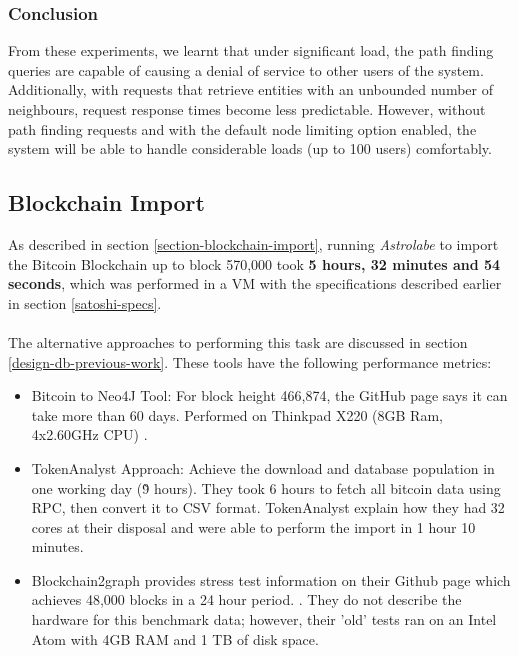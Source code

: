 \subsubsection{Conclusion}
From these experiments, we learnt that under significant load, the path finding queries are capable of causing a denial of service to other users of the system. Additionally, with requests that retrieve entities with an unbounded number of neighbours, request response times become less predictable. However, without path finding requests and with the default node limiting option enabled, the system will be able to handle considerable loads (up to 100 users) comfortably. 


\subsection{Blockchain Import}
As described in section \ref{section-blockchain-import}, running \textit{Astrolabe} to import the Bitcoin Blockchain up to block 570,000 took \textbf{5 hours, 32 minutes and 54 seconds}, which was performed in a VM with the specifications described earlier in section \ref{satoshi-specs}.
\\\\
The alternative approaches to performing this task are discussed in section \ref{design-db-previous-work}. These tools have the following performance metrics:
\begin{itemize}
    \item Bitcoin to Neo4J Tool: For block height 466,874, the GitHub page says it can take more than 60 days. Performed on Thinkpad X220 (8GB Ram, 4x2.60GHz CPU) \cite{RefWorks:doc:5c98e031e4b068320632cef2}. 
    \item TokenAnalyst Approach: Achieve the download and database population in one working day (\~9 hours). They took 6 hours to fetch all bitcoin data using RPC, then convert it to CSV format. TokenAnalyst explain how they had 32 cores at their disposal and were able to perform the import in 1 hour 10 minutes. 
    \cite{RefWorks:doc:5c98e0cde4b044512c0b8641}
    \item Blockchain2graph provides stress test information on their Github page which achieves 48,000 blocks in a 24 hour period.  \cite{RefWorks:doc:5cac6184e4b01c076c63e173}. They do not describe the hardware for this benchmark data; however, their 'old' tests ran on an Intel Atom with 4GB RAM and 1 TB of disk space. 
\end{itemize}


